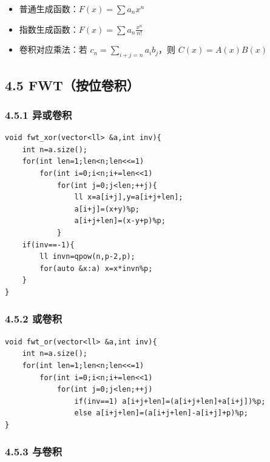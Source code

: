 \documentclass[UTF8,a4paper,11pt]{ctexart}
\begin{document}
\begin{itemize}[leftmargin=2em,itemsep=0.2em,topsep=0.2em]
\item 普通生成函数：$F(x)=\sum a_n x^n$
\item 指数生成函数：$F(x)=\sum a_n\frac{x^n}{n!}$
\item 卷积对应乘法：若 $c_n=\sum_{i+j=n}a_ib_j$，则 $C(x)=A(x)B(x)$

\end{itemize}
\subsection*{4.5 FWT（按位卷积）}

\subsubsection*{4.5.1 异或卷积}

\begin{Verbatim}[fontsize=\small,frame=single,breaklines=true,breakanywhere=true]
void fwt_xor(vector<ll> &a,int inv){
    int n=a.size();
    for(int len=1;len<n;len<<=1)
        for(int i=0;i<n;i+=len<<1)
            for(int j=0;j<len;++j){
                ll x=a[i+j],y=a[i+j+len];
                a[i+j]=(x+y)%p;
                a[i+j+len]=(x-y+p)%p;
            }
    if(inv==-1){
        ll invn=qpow(n,p-2,p);
        for(auto &x:a) x=x*invn%p;
    }
}
\end{Verbatim}

\subsubsection*{4.5.2 或卷积}

\begin{Verbatim}[fontsize=\small,frame=single,breaklines=true,breakanywhere=true]
void fwt_or(vector<ll> &a,int inv){
    int n=a.size();
    for(int len=1;len<n;len<<=1)
        for(int i=0;i<n;i+=len<<1)
            for(int j=0;j<len;++j)
                if(inv==1) a[i+j+len]=(a[i+j+len]+a[i+j])%p;
                else a[i+j+len]=(a[i+j+len]-a[i+j]+p)%p;
}
\end{Verbatim}

\subsubsection*{4.5.3 与卷积}
\end{document}
